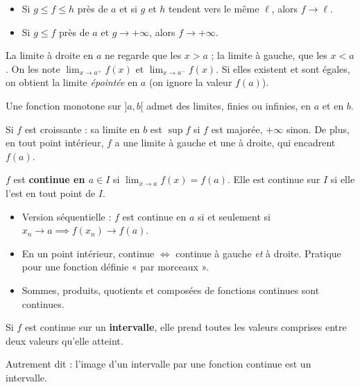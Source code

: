 \documentclass[11pt]{article}
\renewcommand{\leq}{\leqslant}\renewcommand{\geq}{\geqslant}
\begin{document}
\begin{lthm}
\begin{itemize}
\item Si $g\leq f\leq h$ près de $a$ et si $g$ et $h$ tendent vers le même $\ell$, alors $f\to\ell$.
\item Si $g\leq f$ près de $a$ et $g\to+\infty$, alors $f\to+\infty$.
\end{itemize}
\end{lthm}


La limite à droite en $a$ ne regarde que les $x>a$ ; la limite à gauche, que les $x<a$. On les note $\lim_{x\to a^+}f(x)$ et $\lim_{x\to a^-}f(x)$. Si elles existent et sont égales, on obtient la limite \emph{épointée} en $a$ (on ignore la valeur $f(a)$).

\begin{lthm}
Une fonction monotone sur $]a,b[$ admet des limites, finies ou infinies, en $a$ et en $b$.

Si $f$ est croissante : sa limite en $b$ est $\sup f$ si $f$ est majorée, $+\infty$ sinon. De plus, en tout point intérieur, $f$ a une limite à gauche et une à droite, qui encadrent $f(a)$.
\end{lthm}


\begin{ldef}
$f$ est \textbf{continue en $a\in I$} si $\lim_{x\to a}f(x) = f(a)$. Elle est continue sur $I$ si elle l'est en tout point de $I$.
\end{ldef}

\begin{itemize}
\item Version séquentielle : $f$ est continue en $a$ si et seulement si $x_n\to a\implies f(x_n)\to f(a)$.
\item En un point intérieur, continue $\iff$ continue à gauche \emph{et} à droite. Pratique pour une fonction définie « par morceaux ».
\item Sommes, produits, quotients et composées de fonctions continues sont continues.
\end{itemize}


\begin{lthm}
Si $f$ est continue sur un \textbf{intervalle}, elle prend toutes les valeurs comprises entre deux valeurs qu'elle atteint.

Autrement dit : l'image d'un intervalle par une fonction continue est un intervalle.
\end{lthm}
\end{document}
